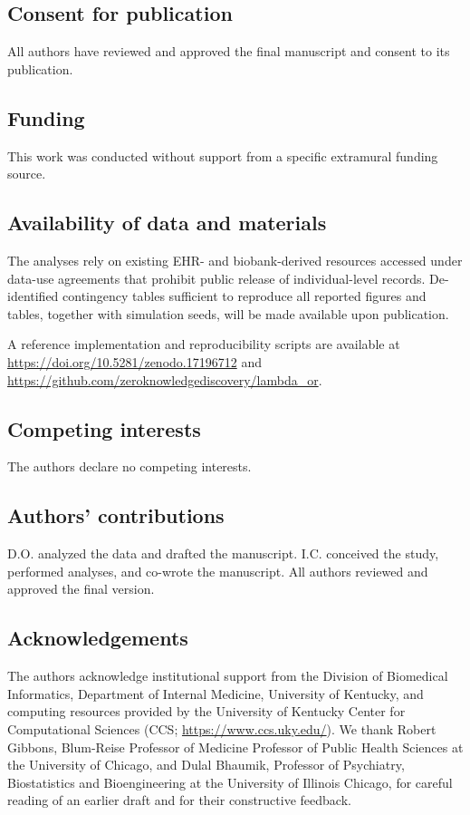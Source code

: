 \documentclass[pdflatex,sn-mathphys-num]{sn-jnl}%
\theoremstyle{thmstyleone}%
\theoremstyle{thmstyletwo}%
\theoremstyle{thmstylethree}%
\begin{document}
\subsection{Consent for publication}
All authors have reviewed and approved the final manuscript and consent to its publication.

\subsection*{Funding}
This work was conducted without support from a specific extramural funding source.

\subsection*{Availability of data and materials}
The analyses rely on existing EHR- and biobank-derived resources accessed under data-use agreements that prohibit public release of individual-level records. De-identified contingency tables sufficient to reproduce all reported figures and tables, together with simulation seeds, will be made available upon publication.

A reference implementation and reproducibility scripts are available at \url{https://doi.org/10.5281/zenodo.17196712} and \url{https://github.com/zeroknowledgediscovery/lambda_or}.

\subsection*{Competing interests}
The authors declare no competing interests.

\subsection*{Authors' contributions}
D.O. analyzed the data and drafted the manuscript. I.C. conceived the study, performed analyses, and co-wrote the manuscript. All authors reviewed and approved the final version.

\subsection*{Acknowledgements}
The authors acknowledge institutional support from the Division of Biomedical Informatics, Department of Internal Medicine, University of Kentucky, and computing resources provided by the University of Kentucky Center for Computational Sciences (CCS; \url{https://www.ccs.uky.edu/}). We thank Robert  Gibbons, Blum-Reise Professor of Medicine
Professor of Public Health Sciences at the University of Chicago, and Dulal Bhaumik,  Professor of Psychiatry, Biostatistics and Bioengineering at the University of Illinois Chicago, for careful reading of an earlier draft and for their constructive feedback.
\end{document}
